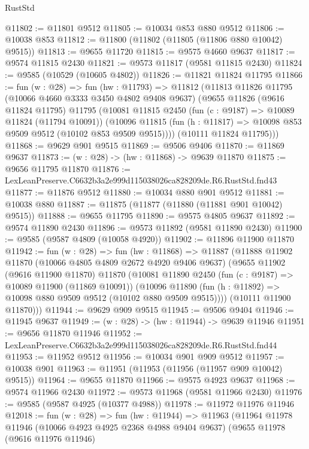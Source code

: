 \begin{lexlean}{RustStd}
\begin{coremodule}
@11802 := @11801 @9512
@11805 := @10034 @853 @880 @9512
@11806 := @10038 @853
@11812 := @11800 (@11802 (@11805 (@11806 @880 @10042) @9515))
@11813 := @9655 @11720
@11815 := @9575 @4660 @9637
@11817 := @9574 @11815 @2430
@11821 := @9573 @11817 (@9581 @11815 @2430)
@11824 := @9585 (@10529 (@10605 @4802))
@11826 := @11821 @11824 @11795
@11866 := fun (w : @28) =>
  fun (hw : @11793) =>
  @11812
    (@11813
      @11826
      @11795
      (@10066 @4660 @3333 @3450 @4802 @9408 @9637)
      (@9655
        @11826
        (@9616 @11824 @11795)
        @11795
        (@10081
          @11815
          @2450
          (fun (c : @9187) => @10089 @11824 (@11794 @10091))
          (@10096 @11815 (fun (h : @11817) => @10098 @853 @9509 @9512 (@10102 @853 @9509 @9515))))
        (@10111 @11824 @11795)))
@11868 := @9629 @901 @9515
@11869 := @9506 @9406
@11870 := @11869 @9637
@11873 := (w : @28) -> (hw : @11868) -> @9639 @11870
@11875 := @9656 @11795 @11870
@11876 := LexLeanPreserve.C6632b3a2e999d115038026ca828209de.R6.RustStd.fnd43
@11877 := @11876 @9512
@11880 := @10034 @880 @901 @9512
@11881 := @10038 @880
@11887 := @11875 (@11877 (@11880 (@11881 @901 @10042) @9515))
@11888 := @9655 @11795
@11890 := @9575 @4805 @9637
@11892 := @9574 @11890 @2430
@11896 := @9573 @11892 (@9581 @11890 @2430)
@11900 := @9585 (@9587 @4809 (@10058 @4920))
@11902 := @11896 @11900 @11870
@11942 := fun (w : @28) =>
  fun (hw : @11868) =>
  @11887
    (@11888
      @11902
      @11870
      (@10066 @4805 @4809 @2672 @4920 @9406 @9637)
      (@9655
        @11902
        (@9616 @11900 @11870)
        @11870
        (@10081
          @11890
          @2450
          (fun (c : @9187) => @10089 @11900 (@11869 @10091))
          (@10096 @11890 (fun (h : @11892) => @10098 @880 @9509 @9512 (@10102 @880 @9509 @9515))))
        (@10111 @11900 @11870)))
@11944 := @9629 @909 @9515
@11945 := @9506 @9404
@11946 := @11945 @9637
@11949 := (w : @28) -> (hw : @11944) -> @9639 @11946
@11951 := @9656 @11870 @11946
@11952 := LexLeanPreserve.C6632b3a2e999d115038026ca828209de.R6.RustStd.fnd44
@11953 := @11952 @9512
@11956 := @10034 @901 @909 @9512
@11957 := @10038 @901
@11963 := @11951 (@11953 (@11956 (@11957 @909 @10042) @9515))
@11964 := @9655 @11870
@11966 := @9575 @4923 @9637
@11968 := @9574 @11966 @2430
@11972 := @9573 @11968 (@9581 @11966 @2430)
@11976 := @9585 (@9587 @4925 (@10377 @4988))
@11978 := @11972 @11976 @11946
@12018 := fun (w : @28) =>
  fun (hw : @11944) =>
  @11963
    (@11964
      @11978
      @11946
      (@10066 @4923 @4925 @2368 @4988 @9404 @9637)
      (@9655
        @11978
        (@9616 @11976 @11946)

\end{coremodule}
\end{lexlean}
